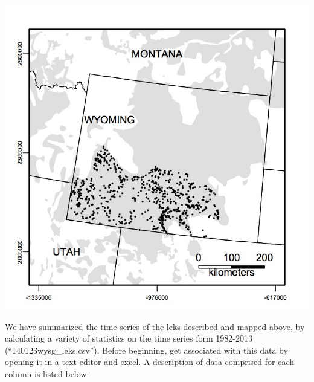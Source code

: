 \documentclass[
]{book}
\begin{document}
\begin{center}\includegraphics[width=0.7\linewidth]{images/lek_locs_map} \end{center}

We have summarized the time-series of the leks described and mapped above, by calculating a variety of statistics on the time series form 1982-2013 (``140123wysg\_leks.csv''). Before beginning, get associated with this data by opening it in a text editor and excel. A description of data comprised for each column is listed below.
\end{document}
